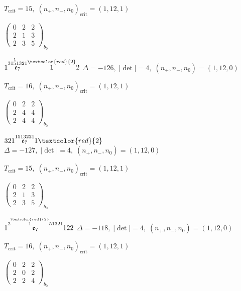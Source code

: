 \documentclass[10pt]{article}
\begin{document}
\hspace{1em}$T_{\text{crit}}=15,\; (n_+,n_-,n_0)_{\text{crit}}=(1,12,1)$

\hspace{2em}$\left(\begin{smallmatrix}0 & 2 & 2 \\ 2 & 1 & 3 \\ 2 & 3 & 5\end{smallmatrix}\right)_{\!b_0}$

$1\overset{31\overset{1}{5}1321}{\mathfrak{e}_7}\overset{\textcolor{red}{2}}{1}2$ \quad $\Delta=-126,\; |\det|=4,\; (n_+,n_-,n_0)=(1,12,0)$

\hspace{1em}$T_{\text{crit}}=16,\; (n_+,n_-,n_0)_{\text{crit}}=(1,12,1)$

\hspace{2em}$\left(\begin{smallmatrix}0 & 2 & 2 \\ 2 & 4 & 4 \\ 2 & 4 & 4\end{smallmatrix}\right)_{\!b_0}$

\smallskip

$321\overset{1513221}{\mathfrak{e}_7}1\textcolor{red}{2}$ \quad $\Delta=-127,\; |\det|=4,\; (n_+,n_-,n_0)=(1,12,0)$

\hspace{1em}$T_{\text{crit}}=15,\; (n_+,n_-,n_0)_{\text{crit}}=(1,12,1)$

\hspace{2em}$\left(\begin{smallmatrix}0 & 2 & 2 \\ 2 & 1 & 3 \\ 2 & 3 & 5\end{smallmatrix}\right)_{\!b_0}$

\smallskip

$1\overset{2\overset{\textcolor{red}{2}}{1}51321}{\mathfrak{e}_7}122$ \quad $\Delta=-118,\; |\det|=4,\; (n_+,n_-,n_0)=(1,12,0)$

\hspace{1em}$T_{\text{crit}}=16,\; (n_+,n_-,n_0)_{\text{crit}}=(1,12,1)$

\hspace{2em}$\left(\begin{smallmatrix}0 & 2 & 2 \\ 2 & 0 & 2 \\ 2 & 2 & 4\end{smallmatrix}\right)_{\!b_0}$
\end{document}
